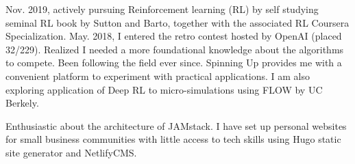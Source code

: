 

\begin{cvparagraph}
Nov. 2019, actively pursuing Reinforcement learning (RL) by self studying seminal
RL book by Sutton and Barto, together with the associated RL Coursera Specialization.
May. 2018, I entered the retro contest hosted by OpenAI (placed 32/229). Realized I
needed a more foundational knowledge about the algorithms to compete. Been following
the field ever since.
Spinning Up provides me with a convenient platform to experiment with practical
applications.
I am also exploring application of Deep RL to micro-simulations
using FLOW by UC Berkely.
\end{cvparagraph}

\begin{cvparagraph}
Enthusiastic about the architecture of JAMstack. I have set up personal websites
for small business communities with little access to tech skills using Hugo static
site generator and NetlifyCMS.
\end{cvparagraph}
